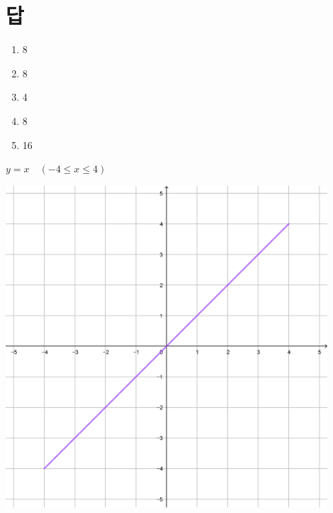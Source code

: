 \documentclass[a4paper]{oblivoir}
\newcounter{num}
\let\oldsection\section
\renewcommand\section{\clearpage\oldsection}
\begin{document}
\section*{답}
\begin{enumerate}[label = (\arabic*)]%
\item
8
\item
8
\item
4
\item
8
\item
16
\end{enumerate}

\begin{minipage}{0.45\textwidth}\centering
\(y=x\quad(-4\le x\le4)\)
\par\bigskip\includegraphics[width=0.9\textwidth]{img/y=x}
\end{minipage}
\end{document}
